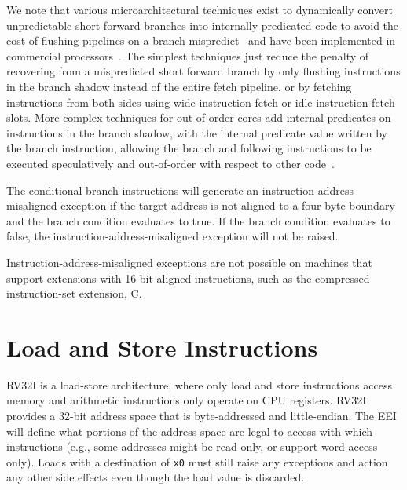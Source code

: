 \begin{commentary}
We note that various microarchitectural techniques exist to
dynamically convert unpredictable short forward branches into
internally predicated code to avoid the cost of flushing pipelines on
a branch mispredict~\cite{heil-tr1996,Klauser-1998,Kim-micro2005} and
have been implemented in commercial processors~\cite{ibmpower7}.
The simplest techniques just reduce the penalty of recovering from a
mispredicted short forward branch by only flushing instructions in the
branch shadow instead of the entire fetch pipeline, or by fetching
instructions from both sides using wide instruction fetch or idle
instruction fetch slots.  More complex techniques for out-of-order
cores add internal predicates on instructions in the branch shadow,
with the internal predicate value written by the branch instruction,
allowing the branch and following instructions to be executed
speculatively and out-of-order with respect to other code~\cite{ibmpower7}.
\end{commentary}

The conditional branch instructions will generate an
instruction-address-misaligned exception if the target address is not
aligned to a four-byte boundary and the branch condition evaluates
to true.  If the branch condition evaluates to false, the
instruction-address-misaligned exception will not be raised.

\begin{commentary}
Instruction-address-misaligned exceptions are not possible on machines
that support extensions with 16-bit aligned instructions, such as the
compressed instruction-set extension, C.
\end{commentary}

\section{Load and Store Instructions}

RV32I is a load-store architecture, where only load and store
instructions access memory and arithmetic instructions only operate on
CPU registers.  RV32I provides a 32-bit address space that is
byte-addressed and little-endian.  The EEI will
define what portions of the address space are legal to access with
which instructions (e.g., some addresses might be read only, or
support word access only).  Loads with a destination of {\tt x0} must
still raise any exceptions and action any other side effects even
though the load value is discarded.

